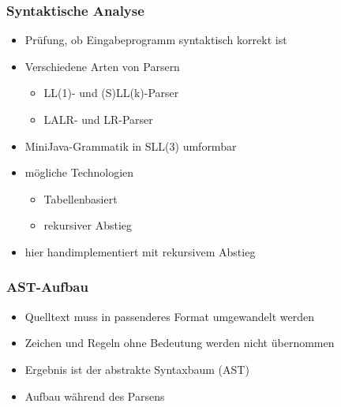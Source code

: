 \begin{frame}
    \frametitle{Syntaktische Analyse}
    \begin{itemize}
    \item Prüfung, ob Eingabeprogramm syntaktisch korrekt ist
    \item Verschiedene Arten von Parsern
    	\begin{itemize}
    	\item LL(1)- und (S)LL(k)-Parser
    	\item LALR- und LR-Parser
    	\end{itemize}
    \item MiniJava-Grammatik in SLL(3) umformbar \pause
    \item mögliche Technologien
	    \begin{itemize}
		\item Tabellenbasiert
		\item rekursiver Abstieg
    	\end{itemize}
    \item hier handimplementiert mit rekursivem Abstieg
    \end{itemize}
\end{frame}

\begin{frame}
	\frametitle{AST-Aufbau}
	\begin{itemize}
	\item Quelltext muss in passenderes Format umgewandelt werden
	\item Zeichen und Regeln ohne Bedeutung werden nicht übernommen
	\item Ergebnis ist der abstrakte Syntaxbaum (AST)
	\item Aufbau während des Parsens
	\end{itemize}
\end{frame}

